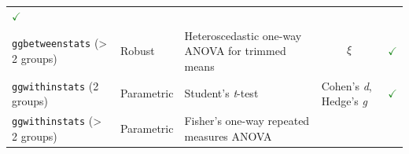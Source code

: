 \documentclass[]{article}
\begin{document}
\begin{longtable}[]{@{}lllll@{}}
\begin{minipage}[t]{0.07\columnwidth}
\textcolor{ForestGreen}{$\checkmark$}\strut
\end{minipage}\tabularnewline
\begin{minipage}[t]{0.20\columnwidth}\raggedright
\texttt{ggbetweenstats} (\textgreater{} 2 groups)\strut
\end{minipage} & \begin{minipage}[t]{0.16\columnwidth}\raggedright
Robust\strut
\end{minipage} & \begin{minipage}[t]{0.31\columnwidth}\raggedright
Heteroscedastic one-way ANOVA for trimmed means\strut
\end{minipage} & \begin{minipage}[t]{0.12\columnwidth}\raggedright
\[\xi\]\strut
\end{minipage} & \begin{minipage}[t]{0.07\columnwidth}\raggedright
\textcolor{ForestGreen}{$\checkmark$}\strut
\end{minipage}\tabularnewline
\begin{minipage}[t]{0.20\columnwidth}\raggedright
\texttt{ggwithinstats} (2 groups)\strut
\end{minipage} & \begin{minipage}[t]{0.16\columnwidth}\raggedright
Parametric\strut
\end{minipage} & \begin{minipage}[t]{0.31\columnwidth}\raggedright
Student's \emph{t}-test\strut
\end{minipage} & \begin{minipage}[t]{0.12\columnwidth}\raggedright
Cohen's \emph{d}, Hedge's \emph{g}\strut
\end{minipage} & \begin{minipage}[t]{0.07\columnwidth}\raggedright
\textcolor{ForestGreen}{$\checkmark$}\strut
\end{minipage}\tabularnewline
\begin{minipage}[t]{0.20\columnwidth}\raggedright
\texttt{ggwithinstats} (\textgreater{} 2 groups)\strut
\end{minipage} & \begin{minipage}[t]{0.16\columnwidth}\raggedright
Parametric\strut
\end{minipage} & \begin{minipage}[t]{0.31\columnwidth}\raggedright
Fisher's one-way repeated measures ANOVA\strut
\end{minipage} & \begin{minipage}[t]{0.12\columnwidth}\raggedright

\end{minipage}
\end{longtable}
\end{document}
